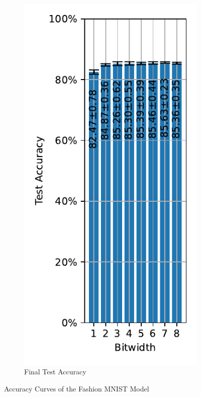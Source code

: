 \begin{figure}[H]
\begin{subfigure}[H]{0.3\textwidth}
                \centering
                \includegraphics[width=\textwidth]{../standard/FashionMNIST/plots/fashionmnist_final_acc.pdf}
                \caption{Final Test Accuracy}
            \end{subfigure}
            \caption{Accuracy Curves of the Fashion MNIST Model}
        \end{figure}

